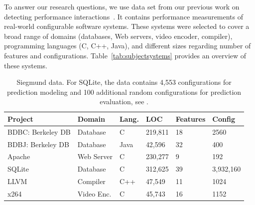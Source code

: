 \documentclass{sig-alternative}
\begin{document}
To answer our research questions, we use data set from our previous work on detecting performance interactions~\cite{SKR+12}. It contains performance measurements of real-world configurable software systems.
These systems were selected to cover a broad range of domains (databases, Web servers, video encoder, compiler), programming languages (C, C++, Java), and different sizes regarding number of features and configurations. Table~\ref{tab:subjectsystems} provides an overview of these systems.
 
 \begin{table}[!t]
\scriptsize
\begin{tabular}{llllll}
  \hline
Project & Domain & Lang. & LOC & Features & Config\\\hline
BDBC: Berkeley DB   & Database & C & 219,811 & 18 & 2560\\
BDBJ: Berkeley DB   & Database & Java & 42,596 & 32  & 400\\
Apache & Web Server & C & 230,277 & 9 & 192\\
SQLite & Database & C & 312,625 & 39 & 3,932,160\\
LLVM & Compiler & C++ & 47,549 & 11 & 1024\\
x264 & Video Enc. & C& 45,743 & 16 & 1152\\\hline
\end{tabular}
 \label{tab:subjectsystems}
\caption{Siegmund data.
For SQLite, the data  contains 4,553 configurations for prediction modeling and 100 additional random configurations for prediction evaluation, see \cite{vapp}.}\label{fig:cpm}
\end{table}
\end{document}
